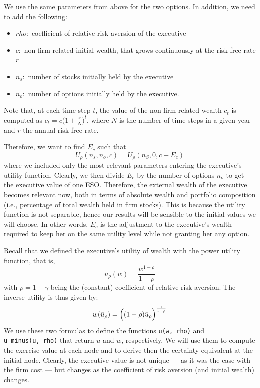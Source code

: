 We use the same parameters from above for the two options. In addition, we need to add the following: 
\begin{itemize}
    \item $rho: $ coefficient of relative risk aversion of the executive
    \item $c: $ non-firm related initial wealth, that grows continuously at the risk-free rate $r$
    \item $n_s: $ number of stocks initially held by the executive
    \item $n_o: $ number of options initially held by the executive.
\end{itemize}
Note that, at each time step $t$, the value of the non-firm related wealth $c_t$ is computed as $c_t = c \bigl(1+\frac{r}{N}\bigr)^{t}$, where $N$ is the number of time steps in a given year and $r$ the annual risk-free rate. 


Therefore, we want to find $E_c$ such that 
$$U_\rho(n_s, n_o, c) = U_\rho(n_S, 0, c + E_c) $$ %
where we included only the most relevant parameters entering the executive's utility function. Clearly, we then divide $E_c$ by the number of options $n_o$ to get the executive value of one ESO. Therefore, the external wealth of the executive becomes relevant now, both in terms of absolute wealth and portfolio composition (i.e., percentage of total wealth held in firm stocks). This is because the utility function is not separable, hence our results will be sensible to the initial values we will choose. In other words, $E_c$ is the adjustment to the executive's wealth required to keep her on the same utility level while not granting her any option.

Recall that we defined the executive's utility of wealth with the power utility function, that is, 
$$\bar{u}_\rho(w) = \frac{w^{1-\rho}}{1-\rho}$$
with $\rho = 1 - \gamma $ being the (constant) coefficient of relative risk aversion. 
The inverse utility is thus given by:
$$w(\bar{u}_\rho) = \Bigl( (1-\rho)\bar{u}_\rho \Bigr)^{\frac{1}{1-\rho}}$$
We use these two formulas to define the functions \verb|u(w, rho)| and \\
\verb|u_minus(u, rho)| that return $\bar{u}$ and $w$, respectively. We will use them to compute the exercise value at each node and to derive then the certainty equivalent at the initial node. Clearly, the executive value is not unique --- as it was the case with the firm cost --- but changes as the coefficient of risk aversion (and initial wealth) changes.

